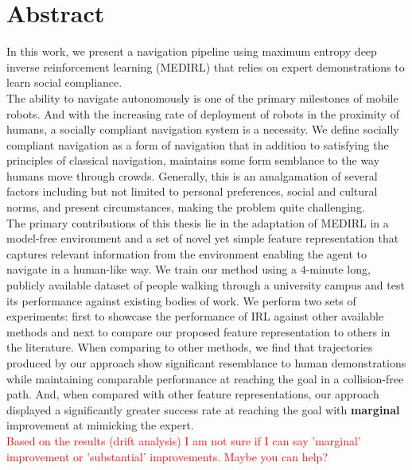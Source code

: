 \chapter*{\rm\bfseries Abstract}
In this work, we present a navigation pipeline using maximum entropy deep inverse reinforcement learning (MEDIRL) that relies on expert demonstrations to learn social compliance.\\
The ability to navigate autonomously is one of the primary milestones of mobile robots. And with the increasing rate of deployment of robots in the proximity of humans, a socially compliant navigation system is a necessity. We define socially compliant navigation as a form of navigation that in addition to satisfying the principles of classical navigation, maintains some form semblance to the way humans move through crowds. Generally, this is an amalgamation of several factors including but not limited to personal preferences, social and cultural norms, and present circumstances, making the problem quite challenging.\\
 The primary contributions of this thesis lie in the adaptation of MEDIRL in a model-free environment and a set of novel yet simple feature representation that captures relevant information from the environment enabling the agent to navigate in a human-like way. We train our method using a $4$-minute long, publicly available dataset of people walking through a university campus and test its performance against existing bodies of work. We perform two sets of experiments: first to showcase the performance of IRL against other available methods and next to compare our proposed feature representation to others in the literature. When comparing to other methods, we find that trajectories produced by our approach show significant resemblance to human demonstrations while maintaining comparable performance at reaching the goal in a collision-free path. And, when compared with other feature representations, our approach displayed a significantly greater success rate at reaching the goal with \textbf{marginal} improvement at mimicking the expert.\\
  \textcolor{red}{Based on the results (drift analysis) I am not sure if I can say 'marginal' improvement or 'substantial' improvements. Maybe you can help?}
 
 


